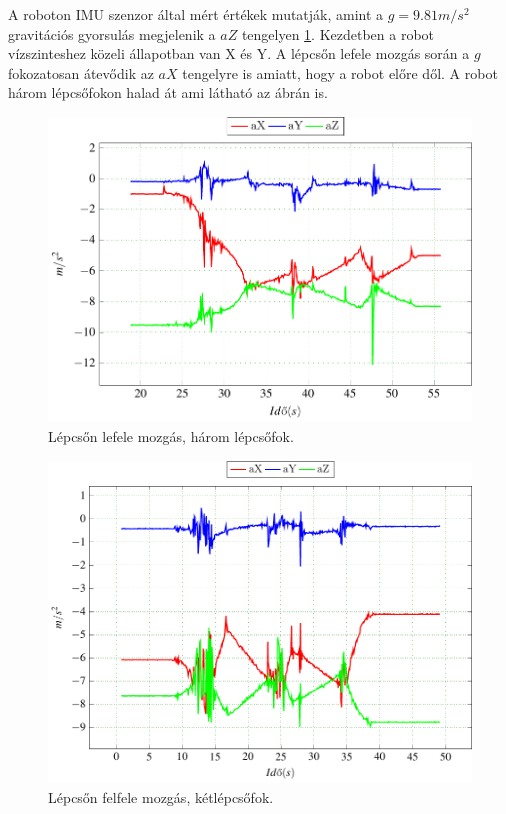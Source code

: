 A roboton IMU szenzor által mért értékek mutatják, amint a $g=9.81 m/s^2$ gravitációs gyorsulás megjelenik a $aZ$ tengelyen \ref{fig:ImuLepcsoLe1}. Kezdetben a robot vízszinteshez közeli állapotban van X és Y.  A lépcsőn lefele mozgás során a $g$ fokozatosan átevődik az $aX$ tengelyre is amiatt, hogy a robot előre dől. A robot három lépcsőfokon halad át ami látható az ábrán is.

\begin{figure}[H]
  \begin{center}
  	\includegraphics[scale=0.9]{tikz/ImuLepcsoLe1.pdf}
  \end{center}
  \caption{Lépcsőn lefele mozgás, három lépcsőfok.}
  \label{fig:ImuLepcsoLe1}
\end{figure}

\begin{figure}[H]
  \begin{center}
  	\includegraphics[scale=0.8]{tikz/ImuLepcsoFel1.pdf}
  \end{center}
  \caption{Lépcsőn felfele mozgás, kétlépcsőfok.}
  \label{fig:ImuLepcsoFel1}
\end{figure}

